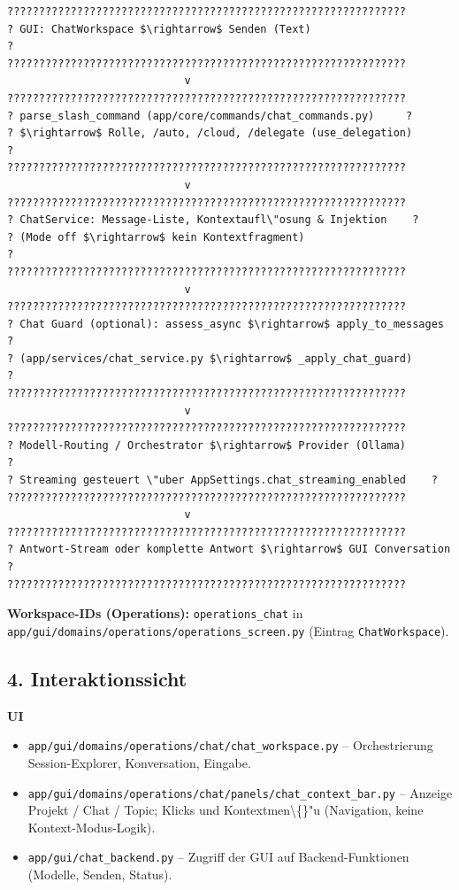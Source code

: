 \begin{verbatim}
???????????????????????????????????????????????????????????????
? GUI: ChatWorkspace $\rightarrow$ Senden (Text)                           ?
???????????????????????????????????????????????????????????????
                            v
???????????????????????????????????????????????????????????????
? parse_slash_command (app/core/commands/chat_commands.py)     ?
? $\rightarrow$ Rolle, /auto, /cloud, /delegate (use_delegation)           ?
???????????????????????????????????????????????????????????????
                            v
???????????????????????????????????????????????????????????????
? ChatService: Message-Liste, Kontextaufl\"osung & Injektion    ?
? (Mode off $\rightarrow$ kein Kontextfragment)                            ?
???????????????????????????????????????????????????????????????
                            v
???????????????????????????????????????????????????????????????
? Chat Guard (optional): assess_async $\rightarrow$ apply_to_messages      ?
? (app/services/chat_service.py $\rightarrow$ _apply_chat_guard)            ?
???????????????????????????????????????????????????????????????
                            v
???????????????????????????????????????????????????????????????
? Modell-Routing / Orchestrator $\rightarrow$ Provider (Ollama)            ?
? Streaming gesteuert \"uber AppSettings.chat_streaming_enabled    ?
???????????????????????????????????????????????????????????????
                            v
???????????????????????????????????????????????????????????????
? Antwort-Stream oder komplette Antwort $\rightarrow$ GUI Conversation      ?
???????????????????????????????????????????????????????????????
\end{verbatim}

\textbf{Workspace-IDs (Operations):} \texttt{operations\_chat} in \texttt{app/gui/domains/operations/operations\_screen.py} (Eintrag \texttt{ChatWorkspace}).

\subsection{4. Interaktionssicht}

\textbf{UI}

\begin{itemize}
\item \texttt{app/gui/domains/operations/chat/chat\_workspace.py} -- Orchestrierung Session-Explorer, Konversation, Eingabe.
\item \texttt{app/gui/domains/operations/chat/panels/chat\_context\_bar.py} -- Anzeige Projekt / Chat / Topic; Klicks und Kontextmen\textbackslash\{\}"u (Navigation, keine Kontext-Modus-Logik).
\item \texttt{app/gui/chat\_backend.py} -- Zugriff der GUI auf Backend-Funktionen (Modelle, Senden, Status).
\end{itemize}

